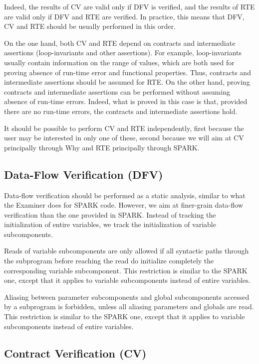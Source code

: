\documentclass{article}
\newcounter{example}
\begin{document}
Indeed, the results of CV are valid only if DFV is verified, and the results of
RTE are valid only if DFV and RTE are verified. In practice, this means that
DFV, CV and RTE should be usually performed in this order.

On the one hand, both CV and RTE depend on contracts and intermediate
assertions (loop-invariants and other assertions). For example, loop-invariants
usually contain information on the range of values, which are both used for
proving absence of run-time error and functional properties. Thus, contracts
and intermediate assertions should be assumed for RTE. On the other hand,
proving contracts and intermediate assertions can be performed without assuming
absence of run-time errors. Indeed, what is proved in this case is that,
provided there are no run-time errors, the contracts and intermediate
assertions hold.

It should be possible to perform CV and RTE independently, first because the
user may be interested in only one of these, second because we will aim at CV
principally through Why and RTE principally through SPARK.

\subsection{Data-Flow Verification (DFV)}
\label{sub:DFV}

Data-flow verification should be performed as a static analysis, similar to
what the Examiner does for SPARK code. However, we aim at finer-grain data-flow
verification than the one provided in SPARK. Instead of tracking the
initialization of entire variables, we track the initialization of variable
subcomponents.

Reads of variable subcomponents are only allowed if all syntactic paths through
the subprogram before reaching the read do initialize completely the
corresponding variable subcomponent. This restriction is similar to the SPARK
one, except that it applies to variable subcomponents instead of entire
variables.

Aliasing between parameter subcomponents and global subcomponents accessed by
a subprogram is forbidden, unless all aliasing parameters and globals are
read. This restriction is similar to the SPARK one, except that it applies to
variable subcomponents instead of entire variables.

\subsection{Contract Verification (CV)}
\end{document}
